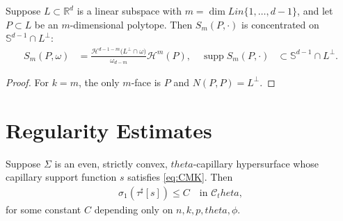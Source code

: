 \documentclass[12pt]{amsart}
\def\theta{theta}%
\def\in{in }%
\numberwithin{equation}{section}
\newcommand{\8}{\infty}
\newcommand{\cC}{\mathcal{C}}
\DeclareMathOperator{\supp}{supp}
\newcommand{\eq}[1]{\begin{equation}\begin{alignedat}{2}#1\end{alignedat}\end{equation}}
\newcommand{\Sd}{\mathbb{S}^{d-1}}
\newcommand{\Hd}{\mathcal{H}}
\begin{document}
\begin{cor}\label{cor:subspace-support}
Suppose $L\subset\mathbb{R}^d$ is a linear subspace with $m=\dim L\in\{1,\dots,d-1\}$, and let
$P\subset L$ be an $m$-dimensional polytope.
Then $S_m(P,\cdot)$ is concentrated on $\Sd\cap L^\perp$:
\eq{
S_m(P,\omega)&=\frac{\Hd^{d-1-m}\big( L^\perp\cap \omega\big)}{\omega_{d-m}}\Hd^{m}(P),\quad
\supp S_m(P,\cdot)& \subset \Sd\cap L^\perp.
}
\end{cor}

\begin{proof}
For $k=m$, the only $m$-face is $P$
and $N(P,P)=L^\perp$.
\end{proof}


\section{Regularity Estimates}\label{sec:regularity}

\begin{lemma}\label{lem:curv-radii-p}
Suppose $\Sigma$ is an even, strictly convex,  $\theta$-capillary hypersurface whose capillary support function $s$ satisfies \eqref{eq:CMK}. 
Then
\eq{
  \sigma_1(\tau^\sharp[s]) \le C
  \quad\text{in }\cC_\theta,
}
for some constant $C$ depending only on $n,k,p,\theta,\phi$.
\end{lemma}
\end{document}
